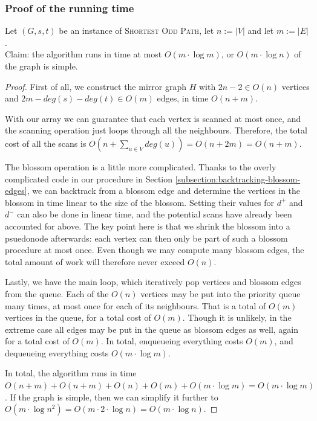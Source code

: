 \subsubsection*{Proof of the running time}
Let $(G,s,t)$ be an instance of \textsc{Shortest Odd Path}, let $n := |V|$ and let $m := |E|$. \\
Claim: the algorithm runs in time at most $O(m \cdot \log m)$, or $O(m \cdot \log n)$ of the graph is simple.
\begin{proof}  
    First of all, we construct the mirror graph $H$ with $2n-2 \in O(n)$ vertices and $2m - deg(s) - deg(t) \in O(m)$ edges, in time $O(n+m)$.
    
    With our  array we can guarantee that each vertex is scanned at most once, and the scanning operation just loops through all the neighbours. Therefore, the total cost of all the scans is $O(n + \sum_{u \in V} deg(u)) = O(n + 2m) = O(n + m)$.

    The blossom operation is a little more complicated. Thanks to the overly complicated code in our  procedure in Section \ref{subsection:backtracking-blossom-edges}, we can backtrack from a blossom edge and determine the vertices in the blossom in time linear to the size of the blossom. Setting their values for $d^+$ and $d^-$ can also be done in linear time, and the potential scans have already been accounted for above. The key point here is that we shrink the blossom into a psuedonode afterwards: each vertex can then only be part of such a blossom procedure at most once. Even though we may compute many blossom edges, the total amount of work will therefore never exceed $O(n)$.

    Lastly, we have the main loop, which iteratively pop vertices and blossom edges from the queue. Each of the $O(n)$ vertices may be put into the priority queue many times, at most once for each of its neighbours. That is a total of $O(m)$ vertices in the queue, for a total cost of $O(m)$. Though it is unlikely, in the extreme case all edges may be put in the queue as blossom edges as well, again for a total cost of $O(m)$. In total, enqueueing everything costs $O(m)$, and dequeueing everything costs $O(m \cdot \log m)$.

    In total, the algorithm runs in time $O(n+m) + O(n+m) + O(n) + O(m) + O(m \cdot \log m) = O(m \cdot \log m)$.
    If the graph is simple, then we can simplify it further to $O(m \cdot \log n^2) = O(m \cdot 2 \cdot \log n) = O(m \cdot \log n)$.
\end{proof}

